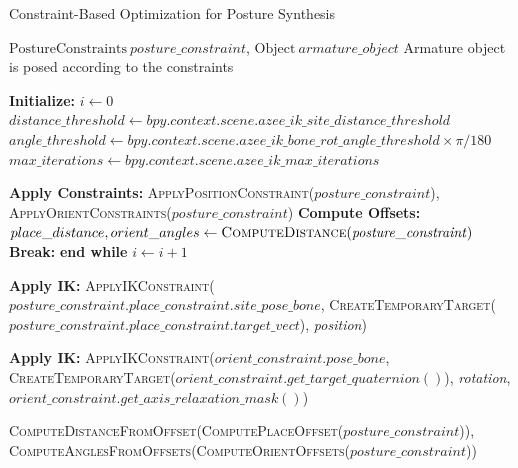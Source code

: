 \documentclass[../../main.tex]{subfiles}
\begin{document}
\begin{algorithm}
  \caption{Constraint-Based Optimization for Posture Synthesis}
  \label{alg:trimmed_constraint_based_optimization}
  \begin{algorithmic}[1]
  \Require $\text{PostureConstraints} \ \mathit{posture\_constraint}$, $\text{Object} \ \mathit{armature\_object}$
  \Ensure Armature object is posed according to the constraints
  
  \State \textbf{Initialize:} $i \gets 0$
  \State $distance\_threshold \gets \mathit{bpy.context.scene.azee\_ik\_site\_distance\_threshold}$
  \State $angle\_threshold \gets \mathit{bpy.context.scene.azee\_ik\_bone\_rot\_angle\_threshold \times \pi / 180}$
  \State $max\_iterations \gets \mathit{bpy.context.scene.azee\_ik\_max\_iterations}$
  
      \State \textbf{Apply Constraints:} \textsc{ApplyPositionConstraint}($\mathit{posture\_constraint}$), \textsc{ApplyOrientConstraints}($\mathit{posture\_constraint}$)
      \State \textbf{Compute Offsets:} $place\_distance, orient\_angles \gets \textsc{ComputeDistance}(\mathit{posture\_constraint})$
          \State \textbf{Break:} \textbf{end while}
      \EndIf
      \State $i \gets i + 1$
  \EndWhile
  
          \State \textbf{Apply IK:} \textsc{ApplyIKConstraint}($\mathit{posture\_constraint.place\_constraint.site\_pose\_bone}$, 
          \textsc{CreateTemporaryTarget}($\mathit{posture\_constraint.place\_constraint.target\_vect}$), \textit{position})
      \EndIf
  \EndProcedure
  
          \State \textbf{Apply IK:} \textsc{ApplyIKConstraint}($orient\_constraint.pose\_bone$, 
          \textsc{CreateTemporaryTarget}($orient\_constraint.get\_target\_quaternion()$), \textit{rotation}, 
          $orient\_constraint.get\_axis\_relaxation\_mask()$)
      \EndFor
  \EndProcedure
  
      \State \Return \textsc{ComputeDistanceFromOffset}(\textsc{ComputePlaceOffset}($\mathit{posture\_constraint}$)), 
      \textsc{ComputeAnglesFromOffsets}(\textsc{ComputeOrientOffsets}($\mathit{posture\_constraint}$))
  \EndProcedure
  \end{algorithmic}
\end{algorithm}
\end{document}
